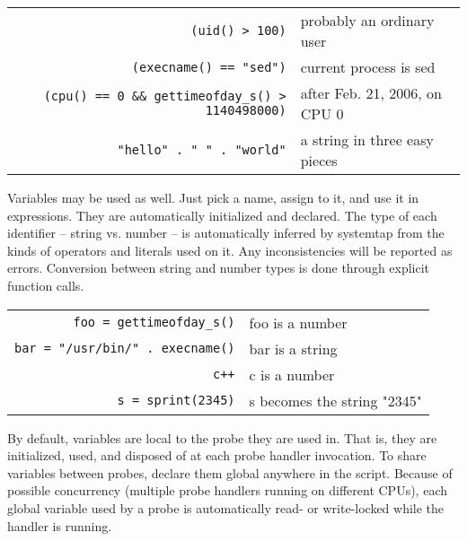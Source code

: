 \documentclass{article}
\renewcommand{\nomenclature}[2]{}
\begin{document}
\begin{tabular}{rl}
\verb+(uid() > 100)+ & probably an ordinary user \\
\verb+(execname() == "sed")+ & current process is sed \\
\verb+(cpu() == 0 && gettimeofday_s() > 1140498000)+ & after Feb. 21, 2006, on CPU 0 \\
\verb+"hello" . " " . "world"+ & a string in three easy pieces \\
\end{tabular}

Variables may be used as well.  Just pick a name, assign to it, and
use it in expressions.  They are automatically initialized and
declared.  The type of each identifier -- string vs. number -- is
automatically inferred by systemtap from the kinds of operators and
literals used on it.  Any inconsistencies will be reported as errors.
Conversion between string and number types is done through explicit
function calls.

\nomenclature{type}{A designation of each identifier such as a
variable, or function, or array value or index, as containing a string
or number.}  \nomenclature{string}{A \verb+\0+-terminated character
string of up to a fixed limit in length.}  \nomenclature{number}{A
64-bit signed integer.}  \nomenclature{type inference}{The automatic
determination of the type of each variable, function parameter, array
value and index, based on their use.}

\begin{tabular}{rl}
\verb+foo = gettimeofday_s()+ & foo is a number \\
\verb+bar = "/usr/bin/" . execname()+ & bar is a string \\
\verb|c++| & c is a number \\
\verb+s = sprint(2345)+ & s becomes the string "2345" \\
\end{tabular}

By default, variables are local to the probe they are used in.  That
is, they are initialized, used, and disposed of at each probe handler
invocation.  To share variables between probes, declare them global
anywhere in the script.  Because of possible concurrency (multiple
probe handlers running on different CPUs), each global variable used
by a probe is automatically read- or write-locked while the handler is
running.  \nomenclature{global variable}{A scalar, array, or aggregate that was
named in a \verb+global+ declaration, sharing that object amongst all
probe handlers and functions executed during a systemtap session.}
\nomenclature{locking}{An automated facility used by systemtap to
protect global variables against concurrent modification and/or
access.}
\end{document}
